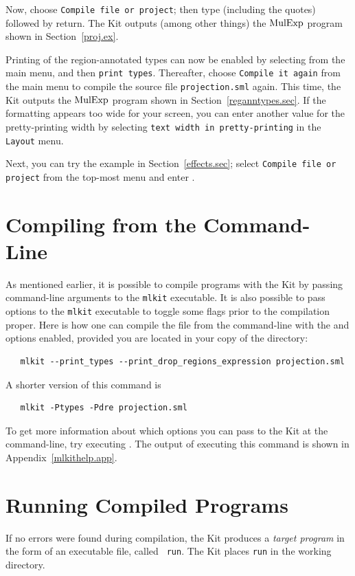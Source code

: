 \documentclass[12pt]{book}
\begin{document}
Now, choose \texttt{Compile file or project}; then type
 (including the quotes) followed by return.
The Kit outputs (among other things) the $\hbox{\rm MulExp}$ program shown in
Section~\ref{proj.ex}. 

Printing of the region-annotated types can now be enabled by selecting
 from the main menu, and then \texttt{print types}.
Thereafter, choose \texttt{Compile it again} from the main menu to
compile the source file {\tt projection.sml} again. This time, the Kit
outputs the $\hbox{\rm MulExp}$ program shown in Section~\ref{reganntypes.sec}.
If the formatting appears too wide for your screen, you can enter
another value for the pretty-printing width by selecting \texttt{text
  width in pretty-printing} in the \texttt{Layout} menu.

Next, you can try the example in Section~\ref{effects.sec}; select
\texttt{Compile file or project} from the top-most menu and enter
.

\section{Compiling from the Command-Line}
As mentioned earlier, it is possible to compile programs with the Kit
by passing command-line arguments to the {\tt mlkit} executable. It is
also possible to pass 
%
%
options to the {\tt mlkit} executable to toggle some flags prior to the
compilation proper. Here is how one can compile the
 file from the command-line with the
 and 
options enabled, provided you are located in your copy of the
 directory:
\begin{verbatim}
   mlkit --print_types --print_drop_regions_expression projection.sml
\end{verbatim}
A shorter version of this command is
\begin{verbatim}
   mlkit -Ptypes -Pdre projection.sml
\end{verbatim}
To get more information about which options you can pass to the Kit at
the command-line, try executing . The output of
executing this command is shown in Appendix~\ref{mlkithelp.app}.

\section{Running Compiled Programs}
If no errors were found during compilation, the Kit produces a
%
{\em target program} in the form of an executable file, called {\tt
  run}. The Kit places {\tt run} in the working directory.
\end{document}
